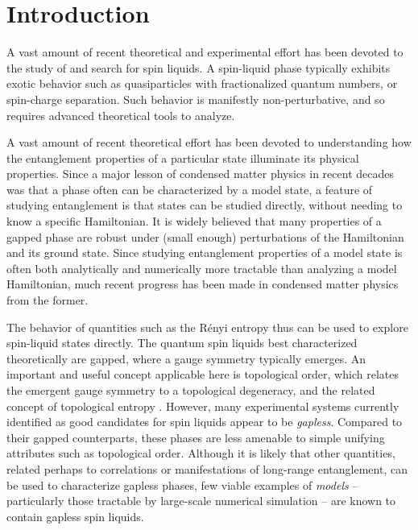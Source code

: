 \documentclass[11pt]{iopart}
\begin{document}
\tableofcontents

\vfill\eject

\section{Introduction}
\label{sec:introduction}



A vast amount of recent theoretical and experimental effort has been devoted to the study of and search for spin liquids. A spin-liquid phase typically exhibits exotic behavior such as quasiparticles 
with fractionalized quantum numbers, or spin-charge separation. Such behavior is manifestly non-perturbative, and so requires advanced theoretical tools to analyze. 

A vast amount of recent theoretical effort has been devoted to understanding how the entanglement properties of a particular state illuminate its physical properties. Since a major lesson of condensed matter physics in recent decades was that a phase often can be characterized by a model state, a feature of studying entanglement is that states can be studied directly, without needing to know a specific Hamiltonian. 
It is widely believed that many properties of a gapped phase are robust under (small enough) perturbations of the Hamiltonian and its ground state. Since studying entanglement properties of a model state is often both analytically and numerically more tractable than analyzing a model Hamiltonian, much recent progress has been made in condensed matter physics from the former.




The behavior of quantities such as the R\'enyi entropy thus can be used to explore spin-liquid states directly. The quantum spin liquids best characterized theoretically are { gapped}, where a gauge symmetry typically emerges.
An important and useful concept applicable here is topological order, which relates the emergent gauge symmetry to a topological degeneracy, and the related concept of { topological entropy} \cite{HIZ,KP,LW}. 
However, many experimental systems currently identified as good candidates for spin liquids appear to be {\it gapless}.  Compared to their gapped counterparts, these phases are less amenable to simple unifying attributes such as topological order.  Although it is likely that other quantities, related perhaps to correlations or manifestations of long-range entanglement, can be used to characterize gapless phases, few viable examples of {\it models} -- particularly those tractable by large-scale numerical simulation -- are known to contain gapless spin liquids.
\end{document}
